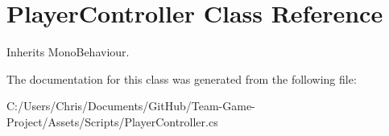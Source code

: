 \hypertarget{class_player_controller}{}\section{Player\+Controller Class Reference}
\label{class_player_controller}


Inherits Mono\+Behaviour.



The documentation for this class was generated from the following file\+:\begin{DoxyCompactItemize}
\item 
C\+:/\+Users/\+Chris/\+Documents/\+Git\+Hub/\+Team-\/\+Game-\/\+Project/\+Assets/\+Scripts/Player\+Controller.\+cs\end{DoxyCompactItemize}
